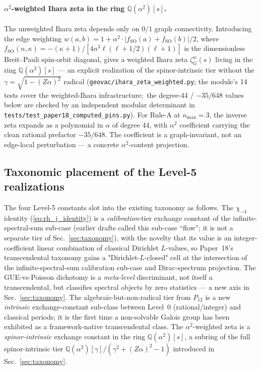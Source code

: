\documentclass[aps,pra,twocolumn,superscriptaddress,longbibliography]{revtex4-2}
\begin{document}
\paragraph{$\alpha^2$-weighted Ihara zeta in the ring
$\mathbb{Q}(\alpha^2)[s]$.}  The unweighted Ihara zeta
depends only on $0/1$ graph connectivity. Introducing the edge
weighting $w(a, b) = 1 + \alpha^2 \cdot |f_{\mathrm{SO}}(a) +
f_{\mathrm{SO}}(b)|/2$, where
$f_{\mathrm{SO}}(n, \kappa) = -(\kappa+1)/[4 n^3 \ell(\ell+1/2)(\ell+1)]$
is the dimensionless Breit--Pauli spin-orbit diagonal, gives a
weighted Ihara zeta $\zeta_G^w(s)$ living in the ring
$\mathbb{Q}(\alpha^2)[s]$ --- an explicit realization of the
spinor-intrinsic tier without the $\gamma = \sqrt{1 - (Z\alpha)^2}$
radical (\texttt{geovac/ihara\_zeta\_weighted.py}; the module's 14 tests
cover the weighted-Ihara infrastructure;\ the degree-44 / $-35/648$
values below are checked by an independent modular determinant in
\texttt{tests/test\_paper18\_computed\_pins.py}).
For Rule-A at $n_{\max}=3$, the inverse zeta expands as a polynomial
in $\alpha$ of degree 44, with $\alpha^2$ coefficient carrying
the clean rational prefactor $-35/648$. The coefficient is a
graph-invariant, not an edge-local perturbation --- a concrete
$\alpha^2$-content projection.

\subsection*{Taxonomic placement of the Level-5 realizations}

The four Level-5 constants slot into the existing taxonomy as
follows. The $\chi_{-4}$ identity (\ref{eq:rh_j_identity}) is a
\emph{calibration}-tier exchange constant of the infinite-spectral-sum
sub-case (earlier drafts called this sub-case ``flow''; it is not a
separate tier of Sec.~\ref{sec:taxonomy}), with the
novelty that its value is an integer-coefficient linear combination
of classical Dirichlet $L$-values, so Paper~18's transcendental
taxonomy gains a "Dirichlet-$L$-closed" cell at the intersection of
the infinite-spectral-sum calibration sub-case and Dirac-spectrum
projection. The GUE-vs-Poisson dichotomy is
a \emph{meta-level} discriminant, not itself a transcendental, but
classifies spectral objects by zero statistics --- a new axis in
Sec.~\ref{sec:taxonomy}. The algebraic-but-non-radical tier from
$P_{12}$ is a new \emph{intrinsic} exchange-constant sub-class
between Level~0 (rational/integer) and classical periods; it is the
first time a non-solvable Galois group has been exhibited as a
framework-native transcendental class. The $\alpha^2$-weighted
zeta is a \emph{spinor-intrinsic} exchange constant in the ring
$\mathbb{Q}(\alpha^2)[s]$, a subring of the full spinor-intrinsic
tier $\mathbb{Q}(\alpha^2)[\gamma]/(\gamma^2 + (Z\alpha)^2 - 1)$
introduced in Sec.~\ref{sec:taxonomy}.
\end{document}
